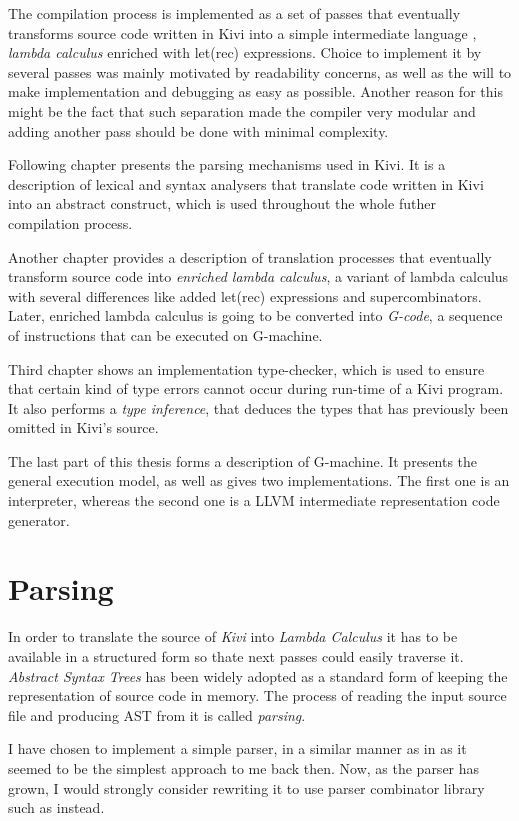 \documentclass[12pt,a4paper]{report}
\begin{document}
The compilation process is implemented as a set of passes that eventually
transforms source code written in Kivi into a simple intermediate language
, \textit{lambda calculus} enriched with let(rec) expressions. Choice to
implement it by several passes was mainly motivated by readability concerns, as
well as the will to make implementation and debugging as easy as possible.
Another reason for this might be the fact that such separation made the
compiler very modular and adding another pass should be done with minimal
complexity.

Following chapter presents the parsing mechanisms used in Kivi. It is a description
of lexical and syntax analysers that translate code written in Kivi into an
abstract construct, which is used throughout the whole futher compilation
process.

Another chapter provides a description of translation processes that eventually
transform source code into \textit{enriched lambda calculus}, a variant of
lambda calculus with several differences like added let(rec) expressions and
supercombinators. Later, enriched lambda calculus is going to be converted
into \textit{G-code}, a sequence of instructions that can be executed on
G-machine.

Third chapter shows an implementation type-checker, which is used to ensure
that certain kind of type errors cannot occur during run-time of a Kivi
program. It also performs a \textit{type inference}, that deduces the types
that has previously been omitted in Kivi's source.

The last part of this thesis forms a description of G-machine. It presents the
general execution model, as well as gives two implementations. The first one is
an interpreter, whereas the second one is a LLVM intermediate representation
code generator.

\chapter{Parsing}

In order to translate the source of \textit{Kivi} into \textit{Lambda Calculus}
it has to be available in a structured form so thate next passes could easily
traverse it. \textit{Abstract Syntax Trees}\cite{ALSU07} has been widely
adopted as a standard form of keeping the representation of source code in
memory. The process of reading the input source file and producing AST from it
is called \textit{parsing}.

I have chosen to implement a simple parser, in a similar manner as in
\cite{JonLes00} as it seemed to be the simplest approach to me back then. Now, as
the parser has grown, I would strongly consider rewriting it to use parser
combinator library such as \cite{website:parsec} instead.
\end{document}
